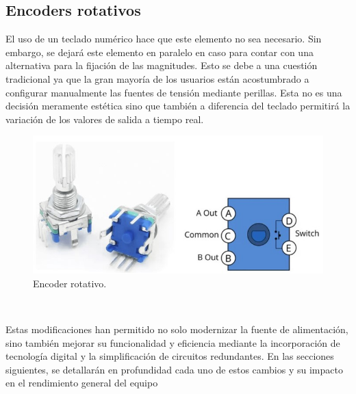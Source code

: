 \subsection{Encoders rotativos}\par 
El uso de un teclado numérico hace que este elemento no sea necesario. Sin embargo, se dejará este elemento en paralelo en caso para contar con una alternativa para la fijación de las magnitudes. Esto se debe a una cuestión tradicional ya que la gran mayoría de los usuarios están acostumbrado a configurar manualmente las fuentes de tensión
mediante perillas.
Esta no es una decisión meramente estética sino que también a diferencia del teclado permitirá la variación de los valores de salida a tiempo real.
\begin{figure}[H]
    \centering
    \includegraphics[scale=0.5]{./imagenes/encoder_rotativo.jpg}
    \caption{Encoder rotativo.}
    \label{F:encoder_rotativo}
\end{figure}
\ 
\ 
\par 
Estas modificaciones han permitido no solo modernizar la fuente de alimentación, sino también mejorar su funcionalidad y eficiencia mediante la incorporación de tecnología digital y la simplificación de circuitos redundantes. En las secciones siguientes, se detallarán en profundidad cada uno de estos cambios y su impacto en el rendimiento general del equipo





